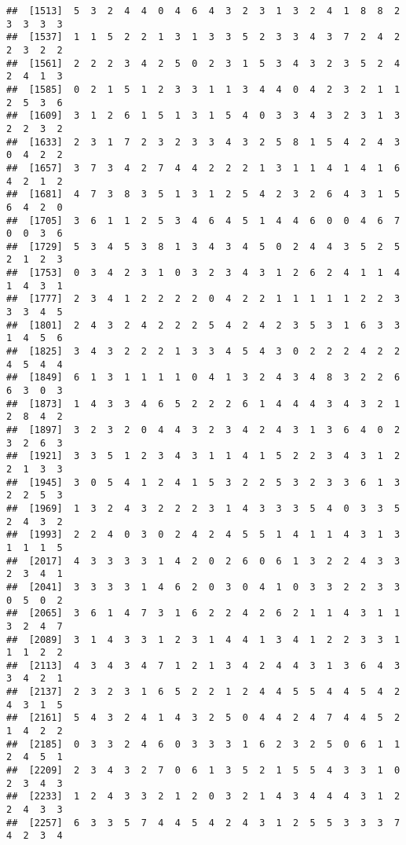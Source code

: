 \documentclass[
]{article}
\begin{document}
\begin{verbatim}
##  [1513]  5  3  2  4  4  0  4  6  4  3  2  3  1  3  2  4  1  8  8  2  3  3  3  3
##  [1537]  1  1  5  2  2  1  3  1  3  3  5  2  3  3  4  3  7  2  4  2  2  3  2  2
##  [1561]  2  2  2  3  4  2  5  0  2  3  1  5  3  4  3  2  3  5  2  4  2  4  1  3
##  [1585]  0  2  1  5  1  2  3  3  1  1  3  4  4  0  4  2  3  2  1  1  2  5  3  6
##  [1609]  3  1  2  6  1  5  1  3  1  5  4  0  3  3  4  3  2  3  1  3  2  2  3  2
##  [1633]  2  3  1  7  2  3  2  3  3  4  3  2  5  8  1  5  4  2  4  3  0  4  2  2
##  [1657]  3  7  3  4  2  7  4  4  2  2  2  1  3  1  1  4  1  4  1  6  4  2  1  2
##  [1681]  4  7  3  8  3  5  1  3  1  2  5  4  2  3  2  6  4  3  1  5  6  4  2  0
##  [1705]  3  6  1  1  2  5  3  4  6  4  5  1  4  4  6  0  0  4  6  7  0  0  3  6
##  [1729]  5  3  4  5  3  8  1  3  4  3  4  5  0  2  4  4  3  5  2  5  2  1  2  3
##  [1753]  0  3  4  2  3  1  0  3  2  3  4  3  1  2  6  2  4  1  1  4  1  4  3  1
##  [1777]  2  3  4  1  2  2  2  2  0  4  2  2  1  1  1  1  1  2  2  3  3  3  4  5
##  [1801]  2  4  3  2  4  2  2  2  5  4  2  4  2  3  5  3  1  6  3  3  1  4  5  6
##  [1825]  3  4  3  2  2  2  1  3  3  4  5  4  3  0  2  2  2  4  2  2  4  5  4  4
##  [1849]  6  1  3  1  1  1  1  0  4  1  3  2  4  3  4  8  3  2  2  6  6  3  0  3
##  [1873]  1  4  3  3  4  6  5  2  2  2  6  1  4  4  4  3  4  3  2  1  2  8  4  2
##  [1897]  3  2  3  2  0  4  4  3  2  3  4  2  4  3  1  3  6  4  0  2  3  2  6  3
##  [1921]  3  3  5  1  2  3  4  3  1  1  4  1  5  2  2  3  4  3  1  2  2  1  3  3
##  [1945]  3  0  5  4  1  2  4  1  5  3  2  2  5  3  2  3  3  6  1  3  2  2  5  3
##  [1969]  1  3  2  4  3  2  2  2  3  1  4  3  3  3  5  4  0  3  3  5  2  4  3  2
##  [1993]  2  2  4  0  3  0  2  4  2  4  5  5  1  4  1  1  4  3  1  3  1  1  1  5
##  [2017]  4  3  3  3  3  1  4  2  0  2  6  0  6  1  3  2  2  4  3  3  2  3  4  1
##  [2041]  3  3  3  3  1  4  6  2  0  3  0  4  1  0  3  3  2  2  3  3  0  5  0  2
##  [2065]  3  6  1  4  7  3  1  6  2  2  4  2  6  2  1  1  4  3  1  1  3  2  4  7
##  [2089]  3  1  4  3  3  1  2  3  1  4  4  1  3  4  1  2  2  3  3  1  1  1  2  2
##  [2113]  4  3  4  3  4  7  1  2  1  3  4  2  4  4  3  1  3  6  4  3  3  4  2  1
##  [2137]  2  3  2  3  1  6  5  2  2  1  2  4  4  5  5  4  4  5  4  2  4  3  1  5
##  [2161]  5  4  3  2  4  1  4  3  2  5  0  4  4  2  4  7  4  4  5  2  1  4  2  2
##  [2185]  0  3  3  2  4  6  0  3  3  3  1  6  2  3  2  5  0  6  1  1  2  4  5  1
##  [2209]  2  3  4  3  2  7  0  6  1  3  5  2  1  5  5  4  3  3  1  0  2  3  4  3
##  [2233]  1  2  4  3  3  2  1  2  0  3  2  1  4  3  4  4  4  3  1  2  2  4  3  3
##  [2257]  6  3  3  5  7  4  4  5  4  2  4  3  1  2  5  5  3  3  3  7  4  2  3  4

\end{verbatim}
\end{document}
